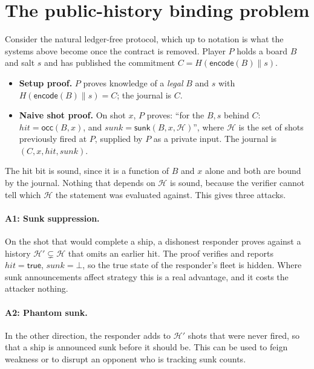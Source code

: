 \documentclass[11pt,a4paper]{article}
\newcommand{\C}{\ensuremath{C}}
\begin{document}
\section{The public-history binding problem}
\label{sec:problem}

Consider the natural ledger-free protocol, which up to notation is what the
systems above become once the contract is removed. Player $P$ holds a board $B$
and salt $s$ and has published the commitment $\C = H(\mathsf{encode}(B)\|s)$.

\begin{itemize}[noitemsep,topsep=2pt]
\item \textbf{Setup proof.} $P$ proves knowledge of a \emph{legal} $B$ and
      $s$ with $H(\mathsf{encode}(B)\|s) = \C$; the journal is $\C$.
\item \textbf{Naive shot proof.} On shot $x$, $P$ proves: ``for the $B,s$
      behind $\C$: $\mathit{hit} = \mathsf{occ}(B,x)$, and
      $\mathit{sunk} = \mathsf{sunk}(B, x, \mathcal{H})$'', where
      $\mathcal{H}$ is the set of shots previously fired at $P$, supplied by
      $P$ as a private input. The journal is
      $(\C, x, \mathit{hit}, \mathit{sunk})$.
\end{itemize}

The hit bit is sound, since it is a function of $B$ and $x$ alone and both are
bound by the journal. Nothing that depends on $\mathcal{H}$ is sound, because
the verifier cannot tell which $\mathcal{H}$ the statement was evaluated
against. This gives three attacks.

\paragraph{A1: Sunk suppression.} On the shot that would complete a ship, a
dishonest responder proves against a history $\mathcal{H}' \subsetneq
\mathcal{H}$ that omits an earlier hit. The proof verifies and reports
$\mathit{hit}=\textsf{true}$, $\mathit{sunk}=\bot$, so the true state of the
responder's fleet is hidden. Where sunk announcements affect strategy this is a
real advantage, and it costs the attacker nothing.

\paragraph{A2: Phantom sunk.} In the other direction, the responder adds to
$\mathcal{H}'$ shots that were never fired, so that a ship is announced sunk
before it should be. This can be used to feign weakness or to disrupt an
opponent who is tracking sunk counts.
\end{document}
